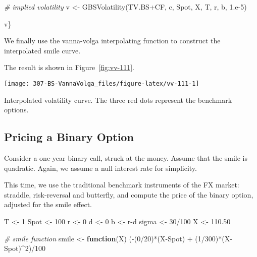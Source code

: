 \documentclass[]{tufte-book}
\newenvironment{Shaded}{}{}
\newcommand{\CommentTok}[1]{\textcolor[rgb]{0.38,0.63,0.69}{\textit{#1}}}
\newcommand{\ControlFlowTok}[1]{\textcolor[rgb]{0.00,0.44,0.13}{\textbf{#1}}}
\newcommand{\DecValTok}[1]{\textcolor[rgb]{0.25,0.63,0.44}{#1}}
\newcommand{\FloatTok}[1]{\textcolor[rgb]{0.25,0.63,0.44}{#1}}
\newcommand{\FunctionTok}[1]{\textcolor[rgb]{0.02,0.16,0.49}{#1}}
\newcommand{\NormalTok}[1]{#1}
\newcommand{\OtherTok}[1]{\textcolor[rgb]{0.00,0.44,0.13}{#1}}
\newcommand{\SpecialCharTok}[1]{\textcolor[rgb]{0.25,0.44,0.63}{#1}}
\newcommand{\StringTok}[1]{\textcolor[rgb]{0.25,0.44,0.63}{#1}}
\begin{document}
\begin{Shaded}
\begin{Highlighting}[]
  \CommentTok{\# implied volatility}
\NormalTok{  v }\OtherTok{\textless{}{-}} \FunctionTok{GBSVolatility}\NormalTok{(TV.BS}\SpecialCharTok{+}\NormalTok{CF, }\StringTok{\textquotesingle{}c\textquotesingle{}}\NormalTok{, Spot, X, T, r, b, }\DecValTok{1}\NormalTok{.e}\DecValTok{{-}5}\NormalTok{)}

\NormalTok{  v\}}
\end{Highlighting}
\end{Shaded}

We finally use the vanna-volga interpolating function to construct the
interpolated smile curve.

The result is shown in Figure~\ref{fig:vv-111}.

\begin{marginfigure}
\texttt{[image: 307-BS-VannaVolga\_files/figure-latex/vv-111-1]} \caption[Interpolated volatility curve]{Interpolated volatility curve. The three red dots represent the benchmark options.}\label{fig:vv-111}
\end{marginfigure}

\hypertarget{pricing-a-binary-option}{%
\subsection{Pricing a Binary Option}\label{pricing-a-binary-option}}

Consider a one-year binary call, struck at the money. Assume that the
smile is quadratic. Again, we assume a null interest rate for
simplicity.

This time, we use the traditional benchmark instruments of the FX
market: straddle, risk-reversal and butterfly, and compute the price of
the binary option, adjusted for the smile effect.

\begin{Shaded}
\begin{Highlighting}[]
\NormalTok{  T }\OtherTok{\textless{}{-}} \DecValTok{1}
\NormalTok{  Spot }\OtherTok{\textless{}{-}} \DecValTok{100}
\NormalTok{  r }\OtherTok{\textless{}{-}} \DecValTok{0}
\NormalTok{  d }\OtherTok{\textless{}{-}} \DecValTok{0}
\NormalTok{  b }\OtherTok{\textless{}{-}}\NormalTok{ r}\SpecialCharTok{{-}}\NormalTok{d}
\NormalTok{  sigma }\OtherTok{\textless{}{-}} \DecValTok{30}\SpecialCharTok{/}\DecValTok{100}
\NormalTok{  X }\OtherTok{\textless{}{-}} \FloatTok{110.50}

  \CommentTok{\# smile function}
\NormalTok{  smile }\OtherTok{\textless{}{-}} \ControlFlowTok{function}\NormalTok{(X) (}\SpecialCharTok{{-}}\NormalTok{(}\DecValTok{0}\SpecialCharTok{/}\DecValTok{20}\NormalTok{)}\SpecialCharTok{*}\NormalTok{(X}\SpecialCharTok{{-}}\NormalTok{Spot) }\SpecialCharTok{+}\NormalTok{ (}\DecValTok{1}\SpecialCharTok{/}\DecValTok{300}\NormalTok{)}\SpecialCharTok{*}\NormalTok{(X}\SpecialCharTok{{-}}\NormalTok{Spot)}\SpecialCharTok{\^{}}\DecValTok{2}\NormalTok{)}\SpecialCharTok{/}\DecValTok{100}
\end{Highlighting}
\end{Shaded}
\end{document}
